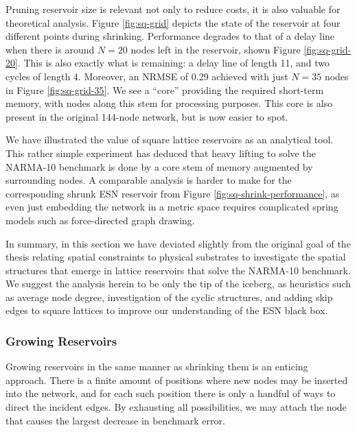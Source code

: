 Pruning reservoir size is relevant not only to reduce costs, it is also valuable
for theoretical analysis. Figure \ref{fig:sq-grid} depicts the state of the
reservoir at four different points during shrinking. Performance degrades to
that of a delay line when there is around $N = 20$ nodes left in the reservoir,
shown Figure \ref{fig:sq-grid-20}. This is also exactly what is remaining: a
delay line of length 11, and two cycles of length 4. Moreover, an NRMSE of 0.29
achieved with just $N = 35$ nodes in Figure \ref{fig:sq-grid-35}. We see a
``core'' providing the required short-term memory, with nodes along this stem
for processing purposes. This core is also present in the original 144-node
network, but is now easier to spot.

We have illustrated the value of square lattice reservoirs as an analytical
tool. This rather simple experiment has deduced that heavy lifting to solve the
NARMA-10 benchmark is done by a core stem of memory augmented by surrounding
nodes. A comparable analysis is harder to make for the corresponding shrunk ESN
reservoir from Figure \ref{fig:sq-shrink-performance}, as even just embedding
the network in a metric space requires complicated spring models such as
force-directed graph drawing.

In summary, in this section we have deviated slightly from the original goal of
the thesis relating spatial constraints to physical substrates to investigate
the spatial structures that emerge in lattice reservoirs that solve the NARMA-10
benchmark. We suggest the analysis herein to be only the tip of the iceberg, as
heuristics such as average node degree, investigation of the cyclic structures,
and adding skip edges to square lattices to improve our understanding of the ESN
black box.

\subsubsection{Growing Reservoirs}

Growing reservoirs in the same manner as shrinking them is an enticing
approach. There is a finite amount of positions where new nodes may be inserted
into the network, and for each such position there is only a handful of ways to
direct the incident edges. By exhausting all possibilities, we may attach the
node that causes the largest decrease in benchmark error.

